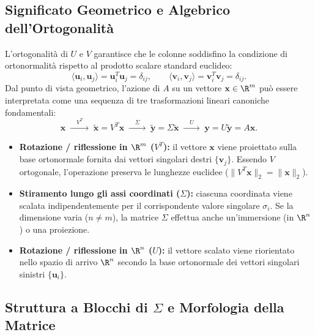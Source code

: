\subsection{Significato Geometrico e Algebrico dell'Ortogonalit\`a}

L'ortogonalit\`a di $U$ e $V$ garantisce che le colonne soddisfino la condizione di ortonormalit\`a rispetto al prodotto scalare standard euclideo:
\begin{equation}
    \langle \mathbf{u}_i, \mathbf{u}_j \rangle = \mathbf{u}_i^T \mathbf{u}_j = \delta_{ij}, \qquad \langle \mathbf{v}_i, \mathbf{v}_j \rangle = \mathbf{v}_i^T \mathbf{v}_j = \delta_{ij}.
\end{equation}
Dal punto di vista geometrico, l'azione di $A$ su un vettore $\mathbf{x} \in \R^m$ pu\`o essere interpretata come una sequenza di tre trasformazioni lineari canoniche fondamentali:
\begin{equation}
    \mathbf{x} \;\xrightarrow{\quad V^T \quad}\; \tilde{\mathbf{x}} = V^T \mathbf{x} \;\xrightarrow{\quad \Sigma \quad}\; \tilde{\mathbf{y}} = \Sigma \tilde{\mathbf{x}} \;\xrightarrow{\quad U \quad}\; \mathbf{y} = U \tilde{\mathbf{y}} = A\mathbf{x}.
\end{equation}
\begin{itemize}
    \item \textbf{Rotazione / riflessione in $\R^m$ ($V^T$):} il vettore $\mathbf{x}$ viene proiettato sulla base ortonormale fornita dai vettori singolari destri $\{\mathbf{v}_j\}$. Essendo $V$ ortogonale, l'operazione preserva le lunghezze euclidee ($\|V^T \mathbf{x}\|_2 = \|\mathbf{x}\|_2$).
    \item \textbf{Stiramento lungo gli assi coordinati ($\Sigma$):} ciascuna coordinata viene scalata indipendentemente per il corrispondente valore singolare $\sigma_i$. Se la dimensione varia ($n \neq m$), la matrice $\Sigma$ effettua anche un'immersione (in $\R^n$) o una proiezione.
    \item \textbf{Rotazione / riflessione in $\R^n$ ($U$):} il vettore scalato viene riorientato nello spazio di arrivo $\R^n$ secondo la base ortonormale dei vettori singolari sinistri $\{\mathbf{u}_i\}$.
\end{itemize}

\subsection{Struttura a Blocchi di \texorpdfstring{$\Sigma$}{Sigma} e Morfologia della Matrice}

